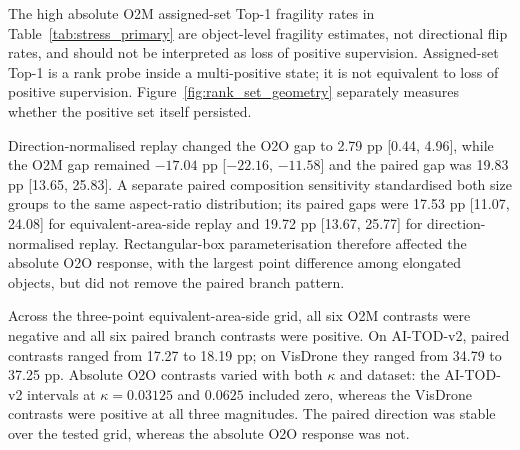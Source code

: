 The high absolute O2M assigned-set Top-1 fragility rates in Table~\ref{tab:stress_primary} are object-level fragility estimates, not directional flip rates, and should not be interpreted as loss of positive supervision. Assigned-set Top-1 is a rank probe inside a multi-positive state; it is not equivalent to loss of positive supervision. Figure~\ref{fig:rank_set_geometry} separately measures whether the positive set itself persisted.

Direction-normalised replay changed the O2O gap to 2.79 pp [0.44, 4.96], while the O2M gap remained $-17.04$ pp [$-22.16$, $-11.58$] and the paired gap was 19.83 pp [13.65, 25.83]. A separate paired composition sensitivity standardised both size groups to the same aspect-ratio distribution; its paired gaps were 17.53 pp [11.07, 24.08] for equivalent-area-side replay and 19.72 pp [13.67, 25.77] for direction-normalised replay. Rectangular-box parameterisation therefore affected the absolute O2O response, with the largest point difference among elongated objects, but did not remove the paired branch pattern.

\begin{table}[t]
\centering
\caption{Primary AI-TOD-v2 fragility rates and stress-contract contrasts in percentage points. Brackets are 95\% stratified image-cluster bootstrap intervals. Gaps are 8--16 minus 16--32 px; positive values denote higher fragility in the 8--16 px group. The paired gap is O2O minus O2M. These are discovery estimates. Support: fixed primary, 6,378 common-valid GTs from 288 contributing images; equivalent-area primary, 6,377 common-valid GTs from 288 contributing images. The primary branch-common support additionally requires the frozen runner/competition state to be defined in both branches; runner availability is a support restriction and is not part of the intrinsic O2O identity-fragility definition.}
\label{tab:stress_primary}

\end{table}

Across the three-point equivalent-area-side grid, all six O2M contrasts were negative and all six paired branch contrasts were positive. On AI-TOD-v2, paired contrasts ranged from 17.27 to 18.19 pp; on VisDrone they ranged from 34.79 to 37.25 pp. Absolute O2O contrasts varied with both $\kappa$ and dataset: the AI-TOD-v2 intervals at $\kappa=0.03125$ and $0.0625$ included zero, whereas the VisDrone contrasts were positive at all three magnitudes. The paired direction was stable over the tested grid, whereas the absolute O2O response was not.

